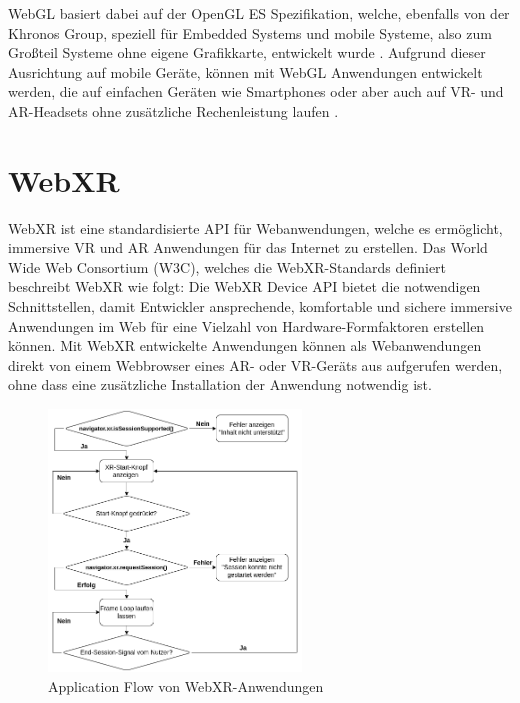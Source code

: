 WebGL basiert dabei auf der OpenGL ES Spezifikation, welche, ebenfalls von der Khronos Group, speziell für Embedded Systems und mobile Systeme, also zum Großteil Systeme ohne eigene Grafikkarte, entwickelt wurde \autocite[]{khronos-opengles}.
Aufgrund dieser Ausrichtung auf mobile Geräte, können mit WebGL Anwendungen entwickelt werden, die auf einfachen Geräten wie Smartphones oder aber auch auf VR- und AR-Headsets ohne zusätzliche Rechenleistung laufen \autocite[][S.3]{Baruah2021}.


\section{WebXR}
\label{section:webxr}

WebXR ist eine standardisierte API für Webanwendungen, welche es ermöglicht, immersive VR und AR Anwendungen für das Internet zu erstellen.
Das World Wide Web Consortium (W3C), welches die WebXR-Standards definiert beschreibt WebXR wie folgt: \glqq{}Die WebXR Device API bietet die notwendigen Schnittstellen, damit Entwickler ansprechende, komfortable und sichere immersive Anwendungen im Web für eine Vielzahl von Hardware-Formfaktoren erstellen können.\grqq{} \autocite[aus dem Englischen mit DeepL ][1. Introduction]{w3c_webxr}
Mit WebXR entwickelte Anwendungen können als Webanwendungen direkt von einem Webbrowser eines AR- oder VR-Geräts aus aufgerufen werden, ohne dass eine zusätzliche Installation der Anwendung notwendig ist.

\begin{figure}[H]
    \centering
    \includegraphics[width=0.6\textwidth]{images/WebXR-App-Flow.png}
    \caption{Application Flow von WebXR-Anwendungen}
    \label{fig:webxr-app-flow}
\end{figure}

